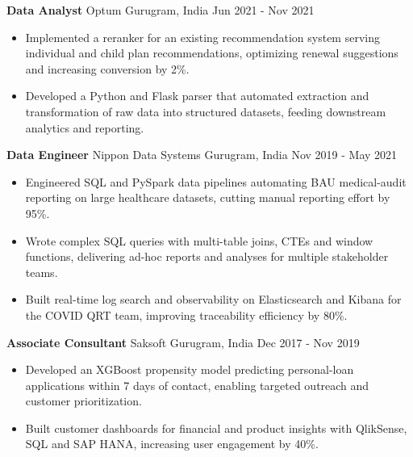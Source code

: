 \documentclass[10pt,a4paper]{article}
\newcommand{\role}[4]{\textbf{#1} \textbar{} #2 \hfill #3 \textbar{} #4\par}
\begin{document}
\vspace{3pt}
\role{Data Analyst}{Optum}{Gurugram, India}{Jun 2021 - Nov 2021}
\begin{itemize}
  \item Implemented a reranker for an existing recommendation system serving individual and child plan recommendations, optimizing renewal suggestions and increasing conversion by 2\%.
  \item Developed a Python and Flask parser that automated extraction and transformation of raw data into structured datasets, feeding downstream analytics and reporting.
\end{itemize}
\vspace{3pt}
\role{Data Engineer}{Nippon Data Systems}{Gurugram, India}{Nov 2019 - May 2021}
\begin{itemize}
  \item Engineered SQL and PySpark data pipelines automating BAU medical-audit reporting on large healthcare datasets, cutting manual reporting effort by 95\%.
  \item Wrote complex SQL queries with multi-table joins, CTEs and window functions, delivering ad-hoc reports and analyses for multiple stakeholder teams.
  \item Built real-time log search and observability on Elasticsearch and Kibana for the COVID QRT team, improving traceability efficiency by 80\%.
\end{itemize}
\vspace{3pt}
\role{Associate Consultant}{Saksoft}{Gurugram, India}{Dec 2017 - Nov 2019}
\begin{itemize}
  \item Developed an XGBoost propensity model predicting personal-loan applications within 7 days of contact, enabling targeted outreach and customer prioritization.
  \item Built customer dashboards for financial and product insights with QlikSense, SQL and SAP HANA, increasing user engagement by 40\%.
\end{itemize}
\end{document}
